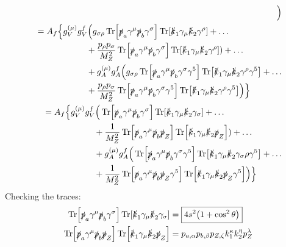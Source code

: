 \documentclass[12 pt,draft]{article}
\renewcommand{\b}[1]{\overline{#1}}
\begin{document}
\begin{problem}[ $\mu\b{\mu}\rightarrow f\b{f}$]
\begin{align}
\begin{split}
				\Big)
			\end{split}\label{eqn:m1m2_sum_of_traces}
			\\
			\begin{split}
				&=A_f
				\Big\{
					g_V^{(\mu)}g_V^f
					\Big(
					g_{\sigma\rho}
					\Tr[\slsh{p}_a\gamma^\mu \slsh{p}_b\gamma^\sigma]
					\Tr[\slsh{k}_1\gamma_\mu \slsh{k}_2\gamma^\rho]
					+\ldots\\&\qquad\qquad\qquad+
					\frac{p_\rho p_\sigma}{M_Z^2}\Tr[\slsh{p}_a\gamma^\mu \slsh{p}_b\gamma^\sigma]
					\Tr[\slsh{k}_1\gamma_\mu \slsh{k}_2\gamma^\rho]
					)
					+\ldots\\&\qquad\qquad\qquad+
					g_A^{(\mu)}g_A^f
					\Big(
					g_{\sigma\rho}
					\Tr[\slsh{p}_a\gamma^\mu \slsh{p}_b\gamma^\sigma\gamma^5]
					\Tr[\slsh{k}_1\gamma_\mu \slsh{k}_2\gamma^\rho\gamma^5]
					+\ldots\\&\qquad\qquad\qquad+
					\frac{p_\rho p_\sigma}{M_Z^2}\Tr[\slsh{p}_a\gamma^\mu \slsh{p}_b\gamma^\sigma\gamma^5]
					\Tr[\slsh{k}_1\gamma_\mu \slsh{k}_2\gamma^\rho\gamma^5]
					\Big)
				\Big\}
			\end{split}
			\\
			\begin{split}
				&=A_f
				\Big\{
					g_V^{(\mu)}g_V^f
					\Big(
					\Tr[\slsh{p}_a\gamma^\mu \slsh{p}_b\gamma^\sigma]
					\Tr[\slsh{k}_1\gamma_\mu \slsh{k}_2\gamma_\sigma]
					+\ldots\\&\qquad\qquad\qquad+
					\oo{M_Z^2}
					\Tr[\slsh{p}_a\gamma^\mu \slsh{p}_b\slsh{p}_Z]
					\Tr[\slsh{k}_1\gamma_\mu \slsh{k}_2\slsh{p}_Z]
					)
					+\ldots\\&\qquad\qquad\qquad+
					g_A^{(\mu)}g_A^f
					\Big(
					\Tr[\slsh{p}_a\gamma^\mu \slsh{p}_b\gamma^\sigma\gamma^5]
					\Tr[\slsh{k}_1\gamma_\mu \slsh{k}_2\gamma_\sigma\rho\gamma^5]
					+\ldots\\&\qquad\qquad\qquad+
					\oo{M_Z^2}
					\Tr[\slsh{p}_a\gamma^\mu \slsh{p}_b\slsh{p}_Z\gamma^5]
					\Tr[\slsh{k}_1\gamma_\mu \slsh{k}_2\slsh{p}_Z\gamma^5]
					\Big)
				\Big\}
			\end{split}
		\end{align}
		Checking the traces:
		\begin{align}
			\Tr[\slsh{p}_a\gamma^\mu \slsh{p}_b\gamma^\sigma]
			\Tr[\slsh{k}_1\gamma_\mu \slsh{k}_2\gamma_\sigma]
			&=\boxed{4s^2\qty(1+\cos^2\theta)}
			\\
			\Tr[\slsh{p}_a\gamma^\mu \slsh{p}_b\slsh{p}_Z]
			\Tr[\slsh{k}_1\gamma_\mu \slsh{k}_2\slsh{p}_Z]
			&=
			p_{a,\alpha}p_{b,\beta}p_{Z,\zeta}k_{1}^{\kappa}k_{2}^{\eta}p_Z^{\lambda}

\end{align}
\end{problem}
\end{document}
